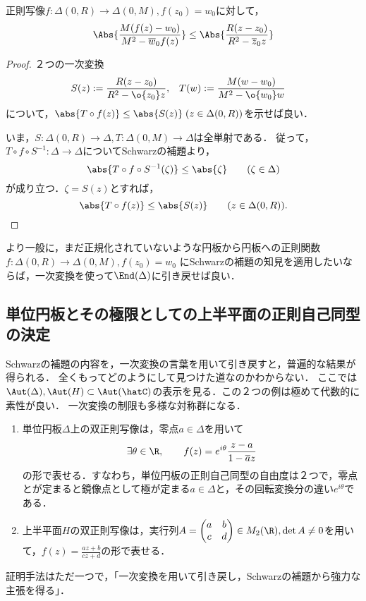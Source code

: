 \documentclass[uplatex, dvipdfmx]{jsreport}
\begin{document}
\begin{corollary}[一次変換は縮小関係を保つ]
    正則写像$f:\Delta(0,R)\to\Delta(0,M),f(z_0)=w_0$に対して，
    \[\Abs{\frac{M(f(z)-w_0)}{M^2-\overline{w}_0f(z)}}\le\Abs{\frac{R(z-z_0)}{R^2-\overline{z}_0z}}\]
\end{corollary}
\begin{proof}
    ２つの一次変換
    \begin{align*}
        S(z)&:=\frac{R(z-z_0)}{R^2-\o{z_0}z},&T(w)&:=\frac{M(w-w_0)}{M^2-\o{w_0}w}
    \end{align*}
    について，$\abs{T\circ f(z)}\le\abs{S(z)}\;(z\in\Delta(0,R))$を示せば良い．

    いま，$S:\Delta(0,R)\to\Delta,T:\Delta(0,M)\to\Delta$は全単射である．
    従って，$T\circ f\circ S^{-1}:\Delta\to\Delta$についてSchwarzの補題より，
    \[\abs{T\circ f\circ S^{-1}(\zeta)}\le\abs{\zeta}\qquad(\zeta\in\Delta)\]
    が成り立つ．$\zeta=S(z)$とすれば，
    \[\abs{T\circ f(z)}\le\abs{S(z)}\qquad(z\in\Delta(0,R)).\]
\end{proof}
\begin{remarks}
    より一般に，まだ正規化されていないような円板から円板への正則関数$f:\Delta(0,R)\to\Delta(0,M),f(z_0)=w_0$
    にSchwarzの補題の知見を適用したいならば，一次変換を使って$\End(\Delta)$に引き戻せば良い．
\end{remarks}

\subsection{単位円板とその極限としての上半平面の正則自己同型の決定}

\begin{tcolorbox}[colframe=ForestGreen, colback=ForestGreen!10!white,breakable,colbacktitle=ForestGreen!40!white,coltitle=black,fonttitle=\bfseries\sffamily,
title=]
    Schwarzの補題の内容を，一次変換の言葉を用いて引き戻すと，普遍的な結果が得られる．
    全くもってどのようにして見つけた道なのかわからない．
    ここでは$\Aut(\Delta),\Aut(H)\subset\Aut(\hatC)$の表示を見る．この２つの例は極めて代数的に素性が良い．
    一次変換の制限も多様な対称群になる．
    \begin{enumerate}
        \item 単位円板$\Delta$上の双正則写像は，零点$a\in\Delta$を用いて
        \[\exists\theta\in\R,\qquad f(z)=e^{i\theta}\frac{z-a}{1-\overline{a}z}\]
        の形で表せる．すなわち，単位円板の正則自己同型の自由度は２つで，零点とが定まると鏡像点として極が定まる$a\in\Delta$と，その回転変換分の違い$e^{i\theta}$である．
        \item 上半平面$H$の双正則写像は，実行列$A=\begin{pmatrix}a&b\\c&d\end{pmatrix}\in M_2(\R),\det A\ne 0$を用いて，$f(z)=\frac{az+b}{cz+d}$の形で表せる．
    \end{enumerate}
    証明手法はただ一つで，「一次変換を用いて引き戻し，Schwarzの補題から強力な主張を得る」．
\end{tcolorbox}
\end{document}
